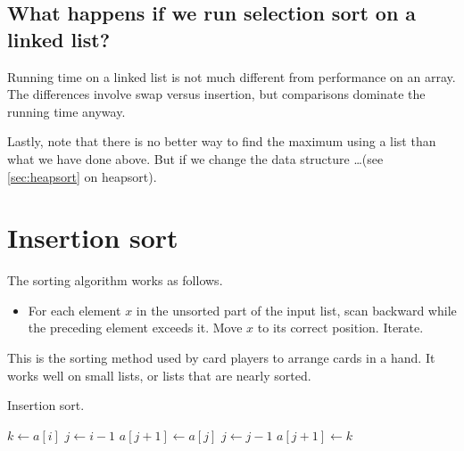 \section{What happens if we run selection sort on a linked list?}
Running time on a linked list is not much different from performance on an array. 
The differences involve swap versus insertion, but comparisons dominate the running time anyway.

Lastly, note that there is no better way to find the maximum using a list than what we have done above. 
But if we change the data structure \dots (see \cref{sec:heapsort} on heapsort).


\chapter{Insertion sort} %
\label{sec:insertionsort}
The sorting algorithm  works as follows.
\begin{itemize}
	\item For each element $x$ in the unsorted part of the input list, 
	scan backward while the preceding element exceeds it. 
	Move $x$ to its correct position. Iterate.
\end{itemize}
This is the sorting method used by card players to arrange cards in a hand.
It works well on small lists, or lists that are nearly sorted.

\begin{algorithm}[H]
  \caption{Insertion sort.}
  \label{alg:insort}
\begin{algorithmic}[1]
		\State $k \gets a[i]$ 
		\State $j \gets i - 1$
			\State {}
			\State $a[j+1] \gets a[j]$
			\State $j \gets j - 1$
		\EndWhile
		\State $a[j+1] \gets k$ 
	\EndFor
	\State {}
\EndFunction  
\end{algorithmic}
\end{algorithm}

